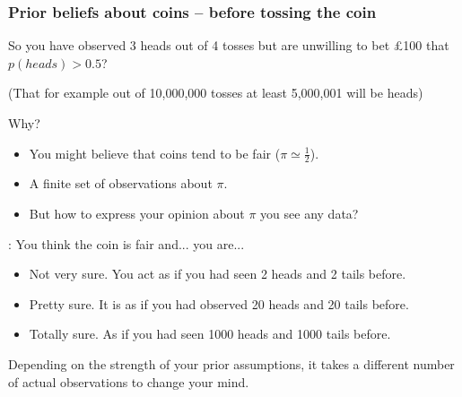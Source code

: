 \begin{frame}
\frametitle{Prior beliefs about coins -- before tossing the coin}

So you have observed 3 heads out of 4 tosses but are unwilling to bet
£100 that $p(heads)>0.5$?

\hfill (That for example out of 10,000,000 tosses at least 5,000,001 will be heads)

\hspace{1ex}

Why?

\begin{itemize}
\item You might believe that coins tend to be fair ($\pi\simeq\tfrac{1}{2}$).
\item A finite set of observations  about $\pi$.
\item But how to express your opinion about $\pi$  you see any data?
\end{itemize}
: You think the coin is fair and... you are...
\begin{itemize}
\item Not very sure. You act as if you had seen 2 heads and 2 tails before.
\item Pretty sure. It is as if you had observed 20 heads and 20 tails before.
\item Totally sure. As if you had seen 1000 heads and 1000 tails before.
\end{itemize}

Depending on the strength of your prior assumptions, it takes a
different number of actual observations to change your mind.


\end{frame}
